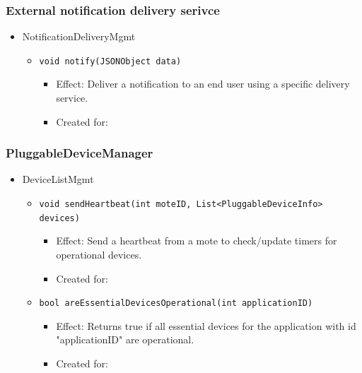     \subsubsection{External notification delivery serivce}
        \begin{itemize}
            \item NotificationDeliveryMgmt
            \begin{itemize}
                \item \texttt{void notify(JSONObject data)}
                \begin{itemize}
                    \item Effect: Deliver a notification to an end user using a specific delivery service.
                    \item Created for:
                \end{itemize}
            \end{itemize}
        \end{itemize}

    \subsubsection{PluggableDeviceManager}
        \begin{itemize}
        	\item DeviceListMgmt
        	\begin{itemize}
        		\item \texttt{void sendHeartbeat(int moteID, List<PluggableDeviceInfo> devices)}
        		\begin{itemize}
        			\item Effect: Send a heartbeat from a mote to check/update timers for operational devices.
        			\item Created for:
        		\end{itemize}
        		\item \texttt{bool areEssentialDevicesOperational(int applicationID)}
        		\begin{itemize}
        			\item Effect: Returns true if all essential devices for the application
                                  with id "applicationID" are operational.
        			\item Created for:
        		\end{itemize}
        	\end{itemize}
        \end{itemize}


